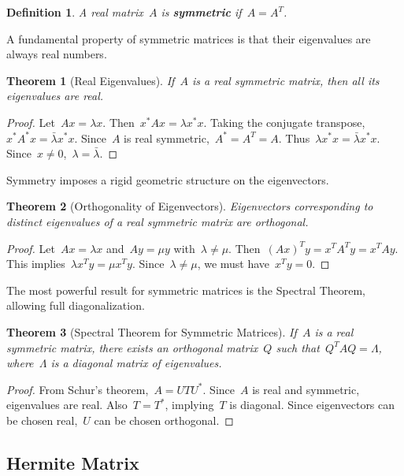 \documentclass[12pt]{article}
\newtheorem{theorem}{Theorem}[section]
\newtheorem{definition}{Definition}[section]
\begin{document}
\begin{definition}
    A real matrix~$A$ is \textbf{symmetric} if~$A = A^T$.
\end{definition}

A fundamental property of symmetric matrices is that their eigenvalues are always real numbers.

\begin{theorem}[Real Eigenvalues]
    If~$A$ is a real symmetric matrix, then all its eigenvalues are real.
\end{theorem}

\begin{proof}
    Let~$Ax = \lambda x$. Then~$x^* A x = \lambda x^* x$. Taking the conjugate transpose,~$x^* A^* x = \bar{\lambda} x^* x$. Since~$A$ is real symmetric,~$A^* = A^T = A$. Thus~$\lambda x^* x = \bar{\lambda} x^* x$. Since~$x \neq 0$,~$\lambda = \bar{\lambda}$.
\end{proof}

Symmetry imposes a rigid geometric structure on the eigenvectors.

\begin{theorem}[Orthogonality of Eigenvectors]
    Eigenvectors corresponding to distinct eigenvalues of a real symmetric matrix are orthogonal.
\end{theorem}

\begin{proof}
    Let~$Ax = \lambda x$ and~$Ay = \mu y$ with~$\lambda \neq \mu$. Then~$(Ax)^T y = x^T A^T y = x^T A y$. This implies~$\lambda x^T y = \mu x^T y$. Since~$\lambda \neq \mu$, we must have~$x^T y = 0$.
\end{proof}

The most powerful result for symmetric matrices is the Spectral Theorem, allowing full diagonalization.

\begin{theorem}[Spectral Theorem for Symmetric Matrices]
    If~$A$ is a real symmetric matrix, there exists an orthogonal matrix~$Q$ such that~$Q^T A Q = \Lambda$, where~$\Lambda$ is a diagonal matrix of eigenvalues.
\end{theorem}

\begin{proof}
    From Schur's theorem,~$A = U T U^*$. Since~$A$ is real and symmetric, eigenvalues are real. Also~$T = T^*$, implying~$T$ is diagonal. Since eigenvectors can be chosen real,~$U$ can be chosen orthogonal.
\end{proof}

\subsection{Hermite Matrix}
\end{document}

